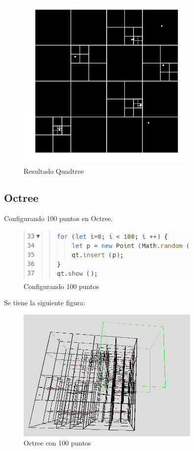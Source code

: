 \documentclass{article}
\begin{document}
\begin{figure}[H]
\centering
\includegraphics[width=0.8\textwidth]{img/quad_result1.png}
\caption{Resultado Quadtree}
\end{figure}


\subsection{Octree}

Configurando 100 puntos en Octree.

\begin{figure}[H]
\centering
\includegraphics[width=0.8\textwidth]{img/oct_100.png}
\caption{Configurando 100 puntos}
\end{figure}

Se tiene la siguiente figura:

\begin{figure}[H]
\centering
\includegraphics[width=0.8\textwidth]{img/oct_100puntos.png}
\caption{Octree con 100 puntos}
\end{figure}
\end{document}

